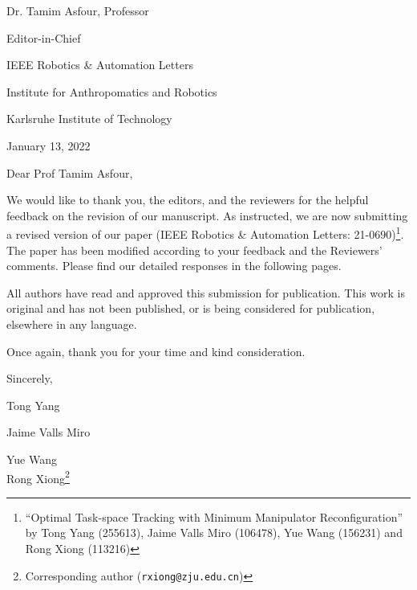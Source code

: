 \documentclass[11pt]{article}
\author{Jaime Valls Miro \and Tong Yang}
\begin{document}
\setlength{\parindent}{0pt}
\hspace*{0.5\linewidth}
\begin{minipage}{0.7\linewidth}
Dr. Tamim Asfour, Professor \par 
Editor-in-Chief \par 
IEEE Robotics \& Automation Letters \par 
Institute for Anthropomatics and Robotics \par 
Karlsruhe Institute of Technology \par
\bigskip
January 13, 2022 %
\end{minipage}

\vspace{2cm}


Dear Prof Tamim Asfour, \par \bigskip

We would like to thank you, the editors, and the reviewers for the helpful feedback on the revision of our manuscript. As instructed, we are now submitting a revised version of our paper (IEEE Robotics \& Automation Letters: 21-0690)\footnote{``Optimal Task-space Tracking with Minimum Manipulator Reconfiguration'' by Tong Yang (255613), Jaime Valls Miro (106478), Yue Wang (156231) and Rong Xiong (113216)}. 
The paper has been modified according to your feedback and the Reviewers' comments. 
Please find our detailed responses in the following pages. 

\par \bigskip All authors have read and approved this submission for publication. This work is original and has not been published, or is being considered for publication, elsewhere in any language. 

\par \bigskip Once again, thank you for your time and kind consideration. 

\bigskip
Sincerely,
\par \bigskip
Tong Yang \par 
Jaime Valls Miro \par
Yue Wang\\
Rong Xiong\footnote{Corresponding author (\texttt{rxiong@zju.edu.cn})} \\
\end{document}
